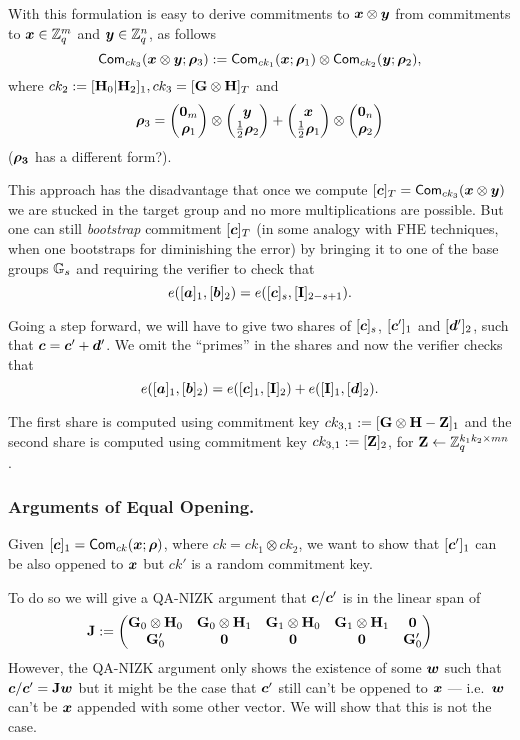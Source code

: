 With this formulation is easy to derive commitments to ${\boldsymbol{x}}\otimes{\boldsymbol{y}}$ from commitments to ${\boldsymbol{x}}\in\mathbb{Z}_q^m$ and ${\boldsymbol{y}}\in\mathbb{Z}_q^n$, as follows
$$
\mathsf{Com}_{ck_3}({\boldsymbol{{\boldsymbol{x}}}}\otimes{\boldsymbol{y}};{\boldsymbol{\rho}}_3):=\mathsf{Com}_{ck_1}({\boldsymbol{x}};{\boldsymbol{\rho}}_1)\otimes\mathsf{Com}_{ck_2}({\boldsymbol{y}};{\boldsymbol{\rho}}_2),
$$
where $ck_2:=[\mathbf{{H}}_0|\mathbf{{H}}_2]_1,ck_3=[\mathbf{{G}}\otimes\mathbf{{H}}]_T$ and
$${\boldsymbol{\rho}}_3=\left(\begin{matrix}{\boldsymbol{0}}_m\\{\boldsymbol{\rho}}_1\end{matrix}\right)\otimes\left(\begin{matrix}{\boldsymbol{y}}\\\frac{1}{2}{\boldsymbol{\rho}}_2\end{matrix}\right)+\left(\begin{matrix}{\boldsymbol{x}}\\\frac{1}{2}{\boldsymbol{\rho}}_1\end{matrix}\right)\otimes\left(\begin{matrix}{\boldsymbol{0}}_n\\{\boldsymbol{\rho}}_2\end{matrix}\right)$$ (${\boldsymbol{\rho_3}}$ has a different form?).

This approach has the disadvantage that once we compute $[{\boldsymbol{c}}]_T=\mathsf{Com}_{ck_3}({\boldsymbol{x}}\otimes{\boldsymbol{y}})$ we are stucked in the target group and no more multiplications are possible. But one can still \emph{bootstrap} commitment $[{\boldsymbol{c}}]_T$ (in some analogy with FHE techniques, when one bootstraps for diminishing the error)  by bringing it to one of the base groups $\mathbb{G}_s$ and requiring the verifier to check that
$$
e([{\boldsymbol{a}}]_1,[{\boldsymbol{b}}]_2)=e([{\boldsymbol{c}}]_s,[\mathbf{{I}}]_{2-s+1}).
$$

Going a step forward, we will have to give two shares of $[{\boldsymbol{c}}]_s$,  $[{\boldsymbol{c}}']_1$ and $[{\boldsymbol{d}}']_2$, such that ${\boldsymbol{c}}={\boldsymbol{c}}'+{\boldsymbol{d}}'$. We omit the ``primes'' in the shares and now the verifier checks that
$$
e([{\boldsymbol{a}}]_1,[{\boldsymbol{b}}]_2)=e([{\boldsymbol{c}}]_1,[\mathbf{{I}}]_{2}) + e([\mathbf{{I}}]_{1},[{\boldsymbol{d}}]_2).
$$

The first share is computed using commitment key $ck_{3,1} := [\mathbf{{G}}\otimes\mathbf{{H}}-\mathbf{{Z}}]_1$ and the second share is computed using commitment key $ck_{3,1} := [\mathbf{{Z}}]_2$, for $\mathbf{{Z}}\gets\mathbb{Z}_q^{k_1k_2\times mn}$.

\subsubsection{Arguments of Equal Opening.} Given $[{\boldsymbol{c}}]_1=\mathsf{Com}_{ck}({\boldsymbol{x}};{\boldsymbol{\rho}})$, where $ck = ck_1\otimes ck_2$, we want to show that $[{\boldsymbol{c}}']_1$ can be also oppened to ${\boldsymbol{x}}$ but $ck'$ is a random commitment key.

To do so we will give a QA-NIZK argument that ${\boldsymbol{c}}/{\boldsymbol{c}}'$ is in the linear span of
$$
\mathbf{{J}}:=
\begin{pmatrix}
\mathbf{{G}}_0\otimes\mathbf{{H}}_0 & \mathbf{{G}}_0\otimes\mathbf{{H}}_1 & \mathbf{{G}}_1\otimes\mathbf{{H}}_0& \mathbf{{G}}_1\otimes\mathbf{{H}}_1 & \mathbf{{0}}\\
\mathbf{{G}}'_0 & \mathbf{{0}} & \mathbf{{0}} & \mathbf{{0}} & \mathbf{{G}}'_0 
\end{pmatrix}
$$
However, the QA-NIZK argument only shows the existence of some ${\boldsymbol{w}}$ such that ${\boldsymbol{c}}/{\boldsymbol{c}}' = \mathbf{{J}}{\boldsymbol{w}}$ but it might be the case that ${\boldsymbol{c}}'$ still can't be oppened to ${\boldsymbol{x}}$ --- i.e.~${\boldsymbol{w}}$ can't be ${\boldsymbol{x}}$ appended with some other vector. We will show that this is not the case.


